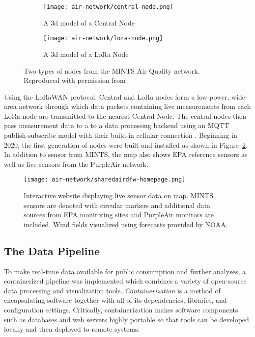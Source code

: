\begin{figure}[!hbt]
  \begin{subfigure}{.5\textwidth}
    \centering
    \texttt{[image: air-network/central-node.png]}
    \caption{A 3d model of a Central Node}
  \end{subfigure}
  \begin{subfigure}{.5\textwidth}
    \centering
    \texttt{[image: air-network/lora-node.png]}
    \caption{A 3d model of a LoRa Node}
  \end{subfigure}
  \caption{Two types of nodes from the MINTS Air Quality network. Reproduced
    with permission from \cite{lakitha-thesis}}
  \label{fig:mints-nodes}
\end{figure}

Using the LoRaWAN protocol, Central and LoRa nodes form a low-power, wide-area
network through which data packets containing live measurements from each
LoRa node are transmitted to the nearest Central Node. The central nodes then
pass measurement data to a to a data processing backend using an MQTT
publish-subscribe model with their build-in cellular connection \cite{mqtt}.
Beginning in 2020, the first generation of nodes were built and installed as
shown in Figure~\ref{fig:sharedair-site}. In addition to sensor from MINTS, the
map also shows EPA reference sensors as well as live sensors from the PurpleAir network.

\begin{figure}[!hbt]
  \centering
  \texttt{[image: air-network/sharedairdfw-homepage.png]}
  \caption{Interactive website displaying live sensor data on map. MINTS sensors
  are denoted with circular markers and additional data sources from EPA
  monitoring sites and PurpleAir monitors are included. Wind fields visualized
  using forecasts provided by NOAA.}
  \label{fig:sharedair-site}
\end{figure}


\subsection{The Data Pipeline}

To make real-time data available for public consumption and further analyses, a
containerized pipeline was implemented which combines a variety of open-source
data processing and visualization tools. \textit{Containerization} is a
method of encapsulating software together with
all of its dependencies, libraries, and configuration settings. Critically,
containerization makes software components such as databases and web servers
highly portable so that tools can be developed locally and then deployed to
remote systems.

